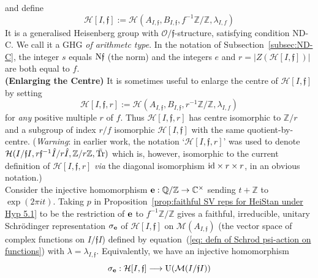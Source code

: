 \documentclass[12pt]{article}
\newcommand{\bbC}{\ensuremath{\mathbb{C}}}\newcommand{\bbCp}{\ensuremath{\mathbb{C}_p}}
\newcommand{\bbQ}{\ensuremath{\mathbb{Q}}}
\newcommand{\bbZ}{\ensuremath{\mathbb{Z}}}
\newcommand{\be}{\ensuremath{{\bf e}}}
\newcommand{\cH}{\ensuremath{\mathcal{H}}}
\newcommand{\cM}{\mathcal{M}}
\newcommand{\cO}{\ensuremath{\mathcal{O}}}
\newcommand{\ff}{\ensuremath{\mathfrak{f}}}
\newcommand{\id}{{\rm id}}
\newcommand{\inv}{^{-1}}%
\renewcommand{\rem}{\refstepcounter{rem}\noindent{\sc Remark \therem}}
\renewcommand{\therem}{\thesection.\arabic{rem}}
\newcommand{\Tr}{{\rm Tr}}
\newcommand{\U}{{\rm U}}
\newcommand{\Zover}[1]{\ensuremath{\bbZ/#1}}
\newcommand{\Zunder}[1]{#1 \inv\bbZ/\bbZ}
\newcommand{\Hei}[4]{\cH({#1},{#2},{#3},{#4})}
\newcommand{\Of}{{\cO/\ff}}
\begin{document}
and define 
$$ 
\cH[I,\ff]:=\Hei{A_{I,\ff}}{B_{I,\ff}}{f\inv\bbZ/\bbZ}{\lambda_{I,f}}
$$ 
It is a generalised Heisenberg group with $\Of$-structure, satisfying condition ND-C. We call it a GHG \textit{of arithmetc type}.  
In the notation of Subsection~\ref{subsec:ND-C}, the integer $s$ equals ${\rm N}\ff$ (the norm) and the integers $e$ and $r=|Z(\cH[I,\ff])|$ are both equal to $f$.\bigskip\\
\rem\label{rem:enlarging the centre} {\bf(Enlarging the Centre)} It is sometimes useful to enlarge the centre of $\cH[I,\ff]$ by setting 
$$
\cH[I,\ff,r]:=\Hei{A_{I,\ff}}{B_{I,\ff}}{r\inv\bbZ/\bbZ}{\lambda_{I,f}}
$$ 
for \textit{any} positive multiple $r$ of $f$. Thus $\cH[I,\ff,r]$ has centre isomorphic to $\Zover{r}$ and a subgroup of index $r/f$ isomorphic $\cH[I,\ff]$ with the  same quotient-by-centre. (\textit{Warning}: in earlier work, the notation `$\cH[I,\ff,r]$' was used to denote  
$\Hei{I/\ff I}{r\ff\inv\hat I/r\hat I}{\bbZ/r\bbZ}{\bar{\Tr}}$ which is, however, isomorphic to the current definition of $\cH[I,\ff,r]$ \textit{via} the diagonal isomorphism $\id \times r \times r$, in an obvious notation.)\bigskip\\
Consider the  injective homomorphism
$\be:\bbQ/\bbZ\rightarrow\bbC^\times$ sending $t+\bbZ$ to $\exp(2\pi it)$. Taking $p$ in Proposition~\ref{prop:faithful SV reps for HeiStan under Hyp 5.1} to be the restriction of $\be$ to $\Zunder{f}$ gives a faithful, irreducible, unitary  Schr\"odinger representation $\sigma_\be$ of $\cH[I,\ff]$ on $\cM(A_{I,\ff})$ (the vector space of complex functions on $I/\ff I$) defined by equation~(\ref{eq: defn of Schrod psi-action on functions}) with $\lambda=\lambda_{I,\ff}$. Equivalently, we have an injective homomorphism  
$$
\sigma_\be:\cH[I,\ff]\longrightarrow \U(\cM(I/\ff I))
$$
\end{document}
